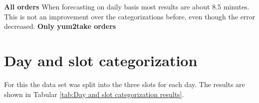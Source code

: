 \newline\newline\textbf{All orders}\newline
When forecasting on daily basis most results are about 8.5 minutes. This is not an improvement over the categorizations before, even though the error decreased.
\newline\newline\textbf{Only yum2take orders}\newline
\section{Day and slot categorization}\label{section:Day and slot categorization}
For this the data set was split into the three slots for each day. The results are shown in Tabular \ref{tab:Day and slot categorization results}.
\begin{table}[h]
\centering
\caption{Day and slot categorization}
\label{tab:Day and slot categorization results}
\end{table}
